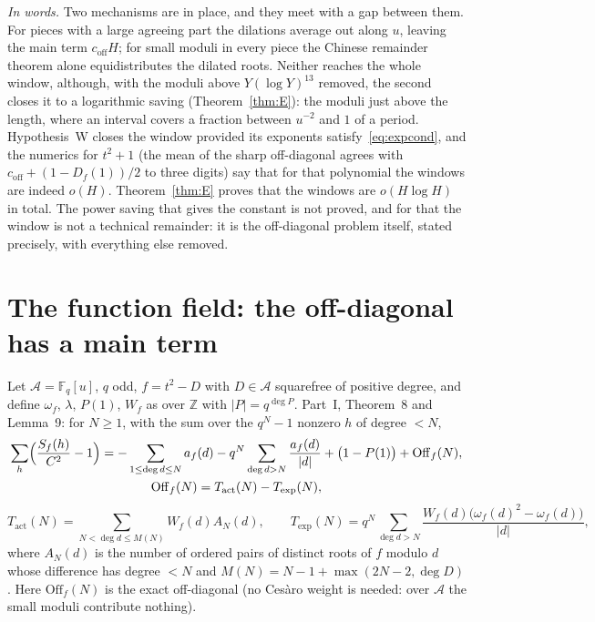 \documentclass[11pt,a4paper]{article}
\theoremstyle{remark}\newtheorem{remark}[theorem]{Remark}
\newcommand{\Z}{\mathbb{Z}}\newcommand{\Q}{\mathbb{Q}}\newcommand{\F}{\mathbb{F}}\newcommand{\R}{\mathbb{R}}
\newcommand{\Off}{\mathrm{Off}}\newcommand{\e}{\mathrm{e}}
\begin{document}
\emph{In words.} Two mechanisms are in place, and they meet with a gap between them. For pieces with a large
agreeing part the dilations average out along $u$, leaving the main term $c_{\mathrm{off}}H$; for small moduli in
every piece the Chinese remainder theorem alone equidistributes the dilated roots. Neither reaches the whole window, although, with the moduli above $Y(\log Y)^{13}$ removed, the second closes it
to a logarithmic saving (Theorem~\ref{thm:E}): the
moduli just above the length, where an interval covers a fraction between $u^{-2}$ and $1$ of a period. Hypothesis~W
closes the window provided its exponents satisfy~\eqref{eq:expcond}, and the numerics for $t^2+1$ (the mean of the
sharp off-diagonal agrees with $c_{\mathrm{off}}+(1-D_f(1))/2$ to three digits) say that for that polynomial the
windows are indeed $o(H)$. Theorem~\ref{thm:E} proves that the windows are $o(H\log H)$ in total. The power saving that gives the constant is not proved, and
for that the window is not a technical remainder: it is the off-diagonal problem itself, stated precisely, with
everything else removed.

\section{The function field: the off-diagonal has a main term}\label{sec:ff}

Let $\mathcal A=\F_q[u]$, $q$ odd, $f=t^2-D$ with $D\in\mathcal A$ squarefree of positive degree, and define $\omega_f$,
$\lambda$, $P(1)$, $W_f$ as over $\Z$ with $|P|=q^{\deg P}$. Part~I, Theorem~8 and Lemma~9: for $N\ge1$, with the sum over
the $q^N-1$ nonzero $h$ of degree $<N$,
\begin{equation}\label{eq:ffid}
\begin{gathered}
\sum_h\Bigl(\frac{S_f(h)}{C^2}-1\Bigr)=-\sum_{1\le\deg d\le N}a_f(d)-q^N\sum_{\deg d>N}\frac{a_f(d)}{|d|}+\bigl(1-P(1)\bigr)+\Off_f(N),\\
\Off_f(N)=T_{\mathrm{act}}(N)-T_{\exp}(N),
\end{gathered}
\end{equation}
\[
T_{\mathrm{act}}(N)=\sum_{N<\deg d\le M(N)}W_f(d)A_N(d),\qquad T_{\exp}(N)=q^N\sum_{\deg d>N}\frac{W_f(d)\bigl(\omega_f(d)^2-\omega_f(d)\bigr)}{|d|},
\]
where $A_N(d)$ is the number of ordered pairs of distinct roots of $f$ modulo $d$ whose difference has degree $<N$
and $M(N)=N-1+\max(2N-2,\deg D)$. Here $\Off_f(N)$ is the exact off-diagonal (no Ces\`aro weight is needed: over
$\mathcal A$ the small moduli contribute nothing).
\end{document}
